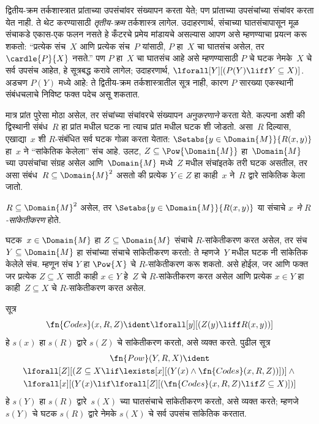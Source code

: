 \begin{explain}

द्वितीय-क्रम तर्कशास्त्रात प्रांताच्या उपसंचांवर
संख्यापन करता येते; पण प्रांताच्या उपसंचांच्या
संचांवर करता येत नाही. ते थेट करण्यासाठी
\emph{तृतीय-क्रम} तर्कशास्त्र लागेल. उदाहरणार्थ,
संचाच्या घातसंचापासून मूळ संचाकडे एकास-एक
फलन नसते हे कँटरचे प्रमेय मांडायचे असल्यास आपण
असे म्हणण्याचा प्रयत्न करू शकतो: ``प्रत्येक
संच~$X$ आणि प्रत्येक संच~$P$ यांसाठी, $P$
हा~$X$ चा घातसंच असेल, तर
$\cardle{P}{X}$ नसते.'' पण $P$ हा~$X$ चा
घातसंच आहे असे म्हणण्यासाठी $P$ चे घटक
नेमके~$X$ चे सर्व उपसंच आहेत, हे सूत्रबद्ध करावे
लागेल; उदाहरणार्थ,
$\lforall[Y][(P(Y) \liff Y \subseteq X)]$.
अडचण $P(Y)$ मध्ये आहे: ते द्वितीय-क्रम
तर्कशास्त्रातील सूत्र नाही, कारण
$P$ सारख्या एकस्थानी संबंधचलाचे निविष्ट फक्त
पदेच असू शकतात.

मात्र प्रांत पुरेसा मोठा असेल, तर संचांच्या संचांवरचे
संख्यापन \emph{अनुकरणाने} करता येते. कल्पना अशी
की द्विस्थानी संबंध~$R$ हा प्रांत मधील
घटक ना त्याच प्रांत मधील
घटक शी जोडतो. असा~$R$ दिल्यास,
एखाद्या~$x$ शी $R$-संबंधित सर्व घटक
गोळा करता येतात: $\Setabs{y \in
  \Domain{M}}{R(x,y)}$ हा~$x$ ने
``सांकेतिक केलेला'' संच आहे. उलट,
$Z \subseteq \Pow{\Domain{M}}$ हा~$\Domain{M}$
च्या उपसंचांचा संग्रह असेल आणि~$\Domain{M}$
मध्ये~$Z$ मधील संचांइतके तरी घटक
असतील, तर असा संबंध~$R \subseteq \Domain{M}^2$
असतो की प्रत्येक $Y \in Z$ हा
काही~$x$ ने~$R$ द्वारे सांकेतिक केला जातो.
\end{explain}

\begin{defn}
$R \subseteq \Domain{M}^2$ असेल, तर
$\Setabs{y \in \Domain{M}}{R(x, y)}$ या संचाचे
\emph{$x$ ने $R$-सांकेतीकरण} होते.
\end{defn}

घटक~$x \in \Domain{M}$ हा
$Z \subseteq \Domain{M}$ संचाचे $R$-सांकेतीकरण
करत असेल, तर संच $Y \subseteq \Domain{M}$ हा
संचांच्या संचाचे सांकेतीकरण करतो: ते म्हणजे~$Y$
मधील घटक नी सांकेतिक केलेले संच.
म्हणून संच $Y$ हा $\Pow{X}$ चे
$R$-सांकेतीकरण करू शकतो. असे होईल, जर
आणि फक्त जर प्रत्येक $Z \subseteq X$ साठी
काही $x \in Y$ हे~$Z$ चे $R$-सांकेतीकरण
करत असेल आणि प्रत्येक $x \in Y$ हा
काही~$Z \subseteq X$ चे $R$-सांकेतीकरण करत असेल.

\begin{prop}
सूत्र
  \[  \fn{Codes}(x, R, Z) \ident \lforall[y][(Z(y) \liff
    R(x, y))]
  \]
हे $s(x)$ हा $s(R)$ द्वारे $s(Z)$ चे
सांकेतीकरण करतो, असे व्यक्त करते. पुढील
सूत्र
\begin{multline*}
  \fn{Pow}(Y, R, X) \ident \\
  \lforall[Z][(Z \subseteq X \lif \lexists[x][(Y(x) \land
    \fn{Codes}(x, R, Z))])] \land {} \\ \lforall[x][(Y(x) \lif
  \lforall[Z][(\fn{Codes}(x, R, Z) \lif Z \subseteq X)])]
\end{multline*}
हे $s(Y)$ हा $s(R)$ द्वारे~$s(X)$ च्या
घातसंचाचे सांकेतीकरण करतो, असे व्यक्त करते;
म्हणजे $s(Y)$ चे घटक $s(R)$ द्वारे
नेमके $s(X)$ चे सर्व उपसंच सांकेतिक करतात.
\end{prop}

